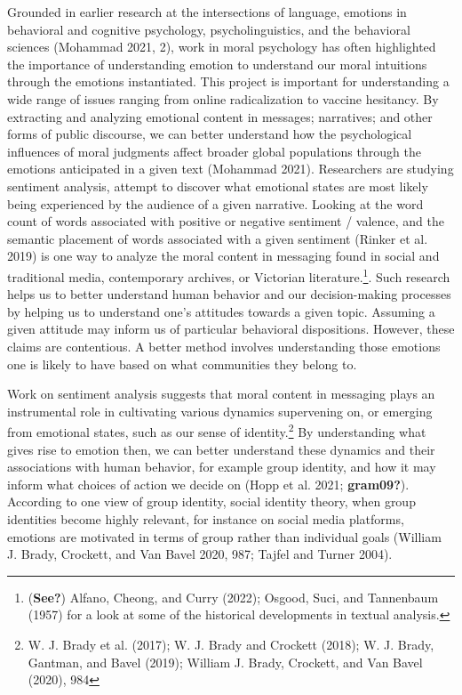 \documentclass[12pt]{book}
\theoremstyle{definition}
\theoremstyle{remark}
\begin{document}
Grounded in earlier research at the intersections of language, emotions in behavioral and cognitive psychology, psycholinguistics, and the behavioral sciences (Mohammad 2021, 2), work in moral psychology has often highlighted the importance of understanding emotion to understand our moral intuitions through the emotions instantiated. This project is important for understanding a wide range of issues ranging from online radicalization to vaccine hesitancy. By extracting and analyzing emotional content in messages; narratives; and other forms of public discourse, we can better understand how the psychological influences of moral judgments affect broader global populations through the emotions anticipated in a given text (Mohammad 2021). Researchers are studying sentiment analysis, attempt to discover what emotional states are most likely being experienced by the audience of a given narrative. Looking at the word count of words associated with positive or negative sentiment / valence, and the semantic placement of words associated with a given sentiment (Rinker et al. 2019) is one way to analyze the moral content in messaging found in social and traditional media, contemporary archives, or Victorian literature.\footnote{(\textbf{See?}) Alfano, Cheong, and Curry (2022); Osgood, Suci, and Tannenbaum (1957) for a look at some of the historical developments in textual analysis.}. Such research helps us to better understand human behavior and our decision-making processes by helping us to understand one's attitudes towards a given topic. Assuming a given attitude may inform us of particular behavioral dispositions. However, these claims are contentious. A better method involves understanding those emotions one is likely to have based on what communities they belong to.

Work on sentiment analysis suggests that moral content in messaging plays an instrumental role in cultivating various dynamics supervening on, or emerging from emotional states, such as our sense of identity.\footnote{W. J. Brady et al. (2017); W. J. Brady and Crockett (2018); W. J. Brady, Gantman, and Bavel (2019); William J. Brady, Crockett, and Van Bavel (2020), 984} By understanding what gives rise to emotion then, we can better understand these dynamics and their associations with human behavior, for example group identity, and how it may inform what choices of action we decide on (Hopp et al. 2021; \textbf{gram09?}). According to one view of group identity, social identity theory, when group identities become highly relevant, for instance on social media platforms, emotions are motivated in terms of group rather than individual goals (William J. Brady, Crockett, and Van Bavel 2020, 987; Tajfel and Turner 2004).
\end{document}
